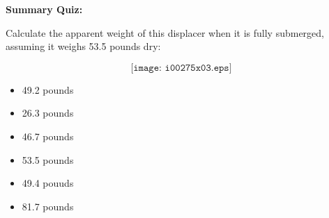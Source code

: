 \vfil \eject

\noindent
{\bf Summary Quiz:}

Calculate the apparent weight of this displacer when it is fully submerged, assuming it weighs 53.5 pounds dry:

$$\texttt{[image: i00275x03.eps]}$$

\begin{itemize}
\item{} 49.2 pounds
\vskip 5pt 
\item{} 26.3 pounds
\vskip 5pt 
\item{} 46.7 pounds
\vskip 5pt 
\item{} 53.5 pounds 
\vskip 5pt 
\item{} 49.4 pouuds
\vskip 5pt 
\item{} 81.7 pounds
\end{itemize}




